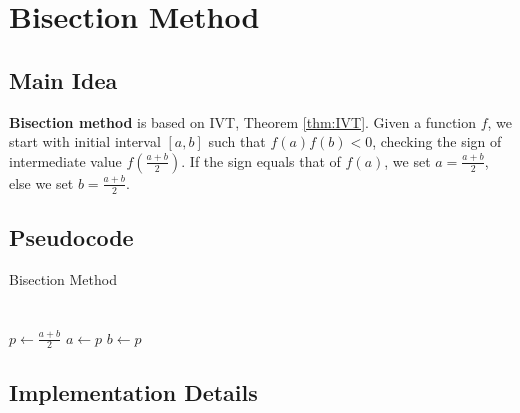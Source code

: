 \section{Bisection Method}
    \subsection{Main Idea}
        \textbf{Bisection method} is based on IVT, Theorem \ref{thm:IVT}.
        Given a function $f$, we start with initial interval $[a, b]$ such that
        $f(a)f(b)<0$, checking the sign of intermediate value 
        $f(\frac{a+b}{2})$. If the sign equals that of $f(a)$, we set $a = \frac{a + b}{2}$, else we set $b = \frac{a + b}{2}$.
    
    \subsection{Pseudocode}
        {Bisection Method}
        {
             \\
             \\
             \\
        }
        {
        }
        {
            {
                $p \leftarrow \frac{a+b}{2}$\;
                {
                     
                }
                {
                    $a \leftarrow p$\;
                }
                \Else
                {
                    $b \leftarrow p$\;
                }
            }
        }

    \subsection{Implementation Details}
